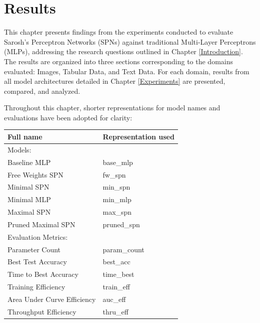 \chapter{Results} %

\label{Results} %

This chapter presents findings from the experiments conducted to evaluate Sarosh’s Perceptron Networks (SPNs) against traditional Multi-Layer Perceptrons (MLPs), addressing the research questions outlined in Chapter \ref{Introduction}. The results are organized into three sections corresponding to the domains evaluated: Images, Tabular Data, and Text Data. For each domain, results from all model architectures detailed in Chapter \ref{Experiments} are presented, compared, and analyzed.

Throughout this chapter, shorter representations for model names and evaluations have been adopted for clarity:

\begin{table}[h!]
    \centering
    \begin{tabular}{ll}
    \textbf{Full name} & \textbf{Representation used} \\
    \hline
    Models: & \\
    \hspace{1em} Baseline MLP & base\_mlp \\
    \hspace{1em} Free Weights SPN & fw\_spn \\
    \hspace{1em} Minimal SPN & min\_spn \\
    \hspace{1em} Minimal MLP & min\_mlp \\
    \hspace{1em} Maximal SPN & max\_spn \\
    \hspace{1em} Pruned Maximal SPN & pruned\_spn \\
    Evaluation Metrics: & \\
    \hspace{1em} Parameter Count & param\_count \\
    \hspace{1em} Best Test Accuracy & best\_acc \\
    \hspace{1em} Time to Best Accuracy & time\_best \\
    \hspace{1em} Training Efficiency & train\_eff \\
    \hspace{1em} Area Under Curve Efficiency & auc\_eff \\
    \hspace{1em} Throughput Efficiency & thru\_eff \\
    \end{tabular}
\end{table}

